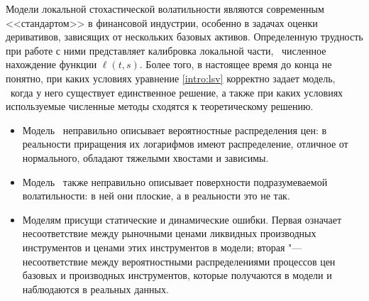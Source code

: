 Модели локальной стохастической волатильности являются современным <<стандартом>> в финансовой индустрии, особенно в задачах оценки деривативов, зависящих от нескольких базовых активов. 
Определенную трудность при работе с ними представляет калибровка локальной части, \te\ численное нахождение функции $\ell(t,s)$.
Более того, в настоящее время до конца не понятно, при каких условиях уравнение \eqref{intro:lsv} корректно задает модель, \te\ когда у него существует единственное решение, а также при каких условиях используемые численные методы сходятся к теоретическому решению. 


\summary
\begin{itemize}
\item Модель \bs\ неправильно описывает вероятностные распределения цен: в реальности приращения их логарифмов имеют распределение, отличное от нормального, обладают тяжелыми хвостами и зависимы.
\item Модель \bs\ также неправильно описывает поверхности подразумеваемой волатильности: в ней они плоские, а в реальности это не так.
\item Моделям присущи статические и динамические ошибки.
Первая означает несоответствие между рыночными ценами ликвидных производных инструментов и ценами этих инструментов в модели; вторая "--- несоответствие между вероятностными распределениями процессов цен базовых и производных инструментов, которые получаются в модели и наблюдаются в реальных данных. 
\end{itemize}
